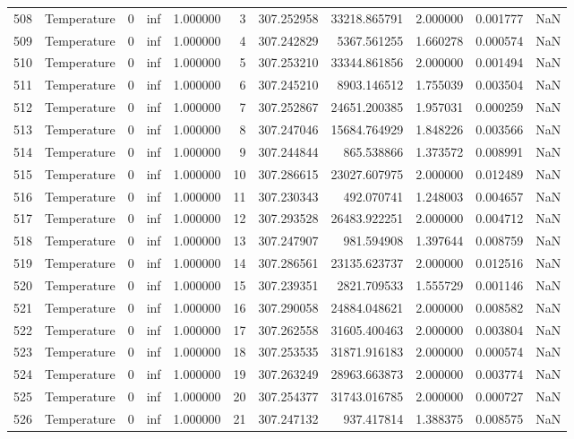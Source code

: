 \begin{tabular}{llrrrrrrrrr}
508 & Temperature & 0 & inf & 1.000000 & 3 & 307.252958 & 33218.865791 & 2.000000 & 0.001777 & NaN \\
509 & Temperature & 0 & inf & 1.000000 & 4 & 307.242829 & 5367.561255 & 1.660278 & 0.000574 & NaN \\
510 & Temperature & 0 & inf & 1.000000 & 5 & 307.253210 & 33344.861856 & 2.000000 & 0.001494 & NaN \\
511 & Temperature & 0 & inf & 1.000000 & 6 & 307.245210 & 8903.146512 & 1.755039 & 0.003504 & NaN \\
512 & Temperature & 0 & inf & 1.000000 & 7 & 307.252867 & 24651.200385 & 1.957031 & 0.000259 & NaN \\
513 & Temperature & 0 & inf & 1.000000 & 8 & 307.247046 & 15684.764929 & 1.848226 & 0.003566 & NaN \\
514 & Temperature & 0 & inf & 1.000000 & 9 & 307.244844 & 865.538866 & 1.373572 & 0.008991 & NaN \\
515 & Temperature & 0 & inf & 1.000000 & 10 & 307.286615 & 23027.607975 & 2.000000 & 0.012489 & NaN \\
516 & Temperature & 0 & inf & 1.000000 & 11 & 307.230343 & 492.070741 & 1.248003 & 0.004657 & NaN \\
517 & Temperature & 0 & inf & 1.000000 & 12 & 307.293528 & 26483.922251 & 2.000000 & 0.004712 & NaN \\
518 & Temperature & 0 & inf & 1.000000 & 13 & 307.247907 & 981.594908 & 1.397644 & 0.008759 & NaN \\
519 & Temperature & 0 & inf & 1.000000 & 14 & 307.286561 & 23135.623737 & 2.000000 & 0.012516 & NaN \\
520 & Temperature & 0 & inf & 1.000000 & 15 & 307.239351 & 2821.709533 & 1.555729 & 0.001146 & NaN \\
521 & Temperature & 0 & inf & 1.000000 & 16 & 307.290058 & 24884.048621 & 2.000000 & 0.008582 & NaN \\
522 & Temperature & 0 & inf & 1.000000 & 17 & 307.262558 & 31605.400463 & 2.000000 & 0.003804 & NaN \\
523 & Temperature & 0 & inf & 1.000000 & 18 & 307.253535 & 31871.916183 & 2.000000 & 0.000574 & NaN \\
524 & Temperature & 0 & inf & 1.000000 & 19 & 307.263249 & 28963.663873 & 2.000000 & 0.003774 & NaN \\
525 & Temperature & 0 & inf & 1.000000 & 20 & 307.254377 & 31743.016785 & 2.000000 & 0.000727 & NaN \\
526 & Temperature & 0 & inf & 1.000000 & 21 & 307.247132 & 937.417814 & 1.388375 & 0.008575 & NaN \\

\end{tabular}

